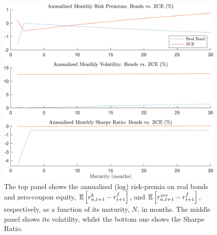 \begin{figure}[h!]
	\centering
		\captionsetup{font=small, width=0.8\textwidth}
		\caption{The top panel shows the annualised (log) risk-premia on real bonds and zero-coupon equity, $\mathbb{E}\left[r_{n,t+1}^{b}-r^f_{t+1}\right]$, and $\mathbb{E}\left[r_{n,t+1}^{zce}-r^f_{t+1}\right]$, respectively, as a function of its maturity, $N$, in months. The middle panel shows its volatility, whilst the bottom one shows the Sharpe Ratio.}\vspace{0.25cm}
	\includegraphics[scale=0.7]{secs/fig/maturities.png}
\end{figure}